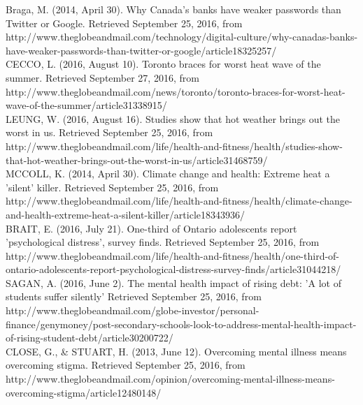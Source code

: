 \documentclass{article}
\begin{document}
\noindent
[2] Braga, M. (2014, April 30). Why Canada's banks have weaker passwords than Twitter or Google. Retrieved September 25, 2016, from \\
http://www.theglobeandmail.com/technology/digital-culture/why-canadas-banks-have-weaker-passwords-than-twitter-or-google/article18325257/ \\

\noindent
[3] CECCO, L. (2016, August 10). Toronto braces for worst heat wave of the summer. Retrieved September 27, 2016, from \\
http://www.theglobeandmail.com/news/toronto/toronto-braces-for-worst-heat-wave-of-the-summer/article31338915/ \\

\noindent
[4] LEUNG, W. (2016, August 16). Studies show that hot weather brings out the worst in us. Retrieved September 25, 2016, from \\
http://www.theglobeandmail.com/life/health-and-fitness/health/studies-show-that-hot-weather-brings-out-the-worst-in-us/article31468759/\\

\noindent
[5] MCCOLL, K. (2014, April 30). Climate change and health: Extreme heat a 'silent' killer. Retrieved September 25, 2016, from http://www.theglobeandmail.com/life/health-and-fitness/health/climate-change-and-health-extreme-heat-a-silent-killer/article18343936/\\

\noindent
[6] BRAIT, E. (2016, July 21). One-third of Ontario adolescents report 'psychological distress', survey finds. Retrieved September 25, 2016, from \\
http://www.theglobeandmail.com/life/health-and-fitness/health/one-third-of-ontario-adolescents-report-psychological-distress-survey-finds/article31044218/\\

\noindent
[7] SAGAN, A. (2016, June 2). The mental health impact of rising debt: 'A lot of students suffer silently' Retrieved September 25, 2016, from \\
http://www.theglobeandmail.com/globe-investor/personal-finance/genymoney/post-secondary-schools-look-to-address-mental-health-impact-of-rising-student-debt/article30200722/\\

\noindent
[8] CLOSE, G., \& STUART, H. (2013, June 12). Overcoming mental illness means overcoming stigma. Retrieved September 25, 2016, from \\
http://www.theglobeandmail.com/opinion/overcoming-mental-illness-means-overcoming-stigma/article12480148/\\
\end{document}
